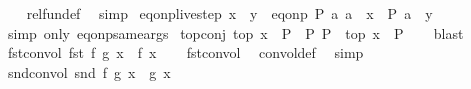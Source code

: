 \begin{isabellebody}
%
\isadelimproof
\ \ %
\endisadelimproof
%
\isatagproof
{}\isamarkupfalse%
\ rel{\isacharunderscore}{\kern0pt}fun{\isacharunderscore}{\kern0pt}def\ \isamarkupfalse%
\ simp%
\endisatagproof
{\isafoldproof}%
%
\isadelimproof
\isanewline
%
\endisadelimproof
\isanewline
{}\isamarkupfalse%
\ eq{\isacharunderscore}{\kern0pt}onp{\isacharunderscore}{\kern0pt}live{\isacharunderscore}{\kern0pt}step{\isacharcolon}{\kern0pt}\ {\isachardoublequoteopen}x\ {\isacharequal}{\kern0pt}\ y\ {\isasymLongrightarrow}\ eq{\isacharunderscore}{\kern0pt}onp\ P\ a\ a\ {\isasymand}\ x\ {\isasymlongleftrightarrow}\ P\ a\ {\isasymand}\ y{\isachardoublequoteclose}\isanewline
%
\isadelimproof
\ \ %
\endisadelimproof
%
\isatagproof
{}\isamarkupfalse%
\ {\isacharparenleft}{\kern0pt}simp\ only{\isacharcolon}{\kern0pt}\ eq{\isacharunderscore}{\kern0pt}onp{\isacharunderscore}{\kern0pt}same{\isacharunderscore}{\kern0pt}args{\isacharparenright}{\kern0pt}%
\endisatagproof
{\isafoldproof}%
%
\isadelimproof
\isanewline
%
\endisadelimproof
\isanewline
{}\isamarkupfalse%
\ top{\isacharunderscore}{\kern0pt}conj{\isacharcolon}{\kern0pt}\ {\isachardoublequoteopen}top\ x\ {\isasymand}\ P\ {\isasymlongleftrightarrow}\ P{\isachardoublequoteclose}\ {\isachardoublequoteopen}P\ {\isasymand}\ top\ x\ {\isasymlongleftrightarrow}\ P{\isachardoublequoteclose}\isanewline
%
\isadelimproof
\ \ %
\endisadelimproof
%
\isatagproof
{}\isamarkupfalse%
\ blast{\isacharplus}{\kern0pt}%
\endisatagproof
{\isafoldproof}%
%
\isadelimproof
\isanewline
%
\endisadelimproof
\isanewline
{}\isamarkupfalse%
\ fst{\isacharunderscore}{\kern0pt}convol{\isacharprime}{\kern0pt}{\isacharcolon}{\kern0pt}\ {\isachardoublequoteopen}fst\ {\isacharparenleft}{\kern0pt}{\isasymlangle}f{\isacharcomma}{\kern0pt}\ g{\isasymrangle}\ x{\isacharparenright}{\kern0pt}\ {\isacharequal}{\kern0pt}\ f\ x{\isachardoublequoteclose}\isanewline
%
\isadelimproof
\ \ %
\endisadelimproof
%
\isatagproof
{}\isamarkupfalse%
\ fst{\isacharunderscore}{\kern0pt}convol\ \isamarkupfalse%
\ convol{\isacharunderscore}{\kern0pt}def\ \isamarkupfalse%
\ simp%
\endisatagproof
{\isafoldproof}%
%
\isadelimproof
\isanewline
%
\endisadelimproof
\isanewline
{}\isamarkupfalse%
\ snd{\isacharunderscore}{\kern0pt}convol{\isacharprime}{\kern0pt}{\isacharcolon}{\kern0pt}\ {\isachardoublequoteopen}snd\ {\isacharparenleft}{\kern0pt}{\isasymlangle}f{\isacharcomma}{\kern0pt}\ g{\isasymrangle}\ x{\isacharparenright}{\kern0pt}\ {\isacharequal}{\kern0pt}\ g\ x{\isachardoublequoteclose}\isanewline

\end{isabellebody}
